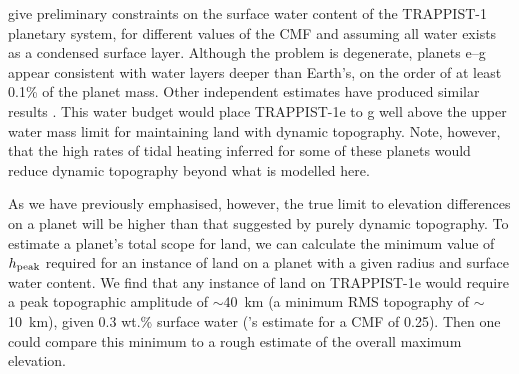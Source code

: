 \documentclass[trackchanges]{aastex63}
\newcommand{\todo}[1]{\textit{\textcolor{violet}{{#1}}}}
\begin{document}



\citet{agol_refining_2021} give preliminary constraints on the surface water content of the TRAPPIST-1 planetary system, for different values of the CMF and assuming all water exists as a condensed surface layer. Although the problem is degenerate, planets e--g appear consistent with water layers deeper than Earth's, on the order of at least 0.1\% of the planet mass. Other independent estimates have produced similar results \citep{acuna_characterisation_2021}.  %
This water budget would place TRAPPIST-1e to g well above the upper water mass limit for maintaining land with dynamic topography. Note, however, that the high rates of tidal heating inferred for some of these planets \citep{barr_interior_2018} would reduce dynamic topography beyond what is modelled here.

As we have previously emphasised, however, the true limit to elevation differences on a planet will be higher than that suggested by purely dynamic topography. To estimate a planet's total scope for land, we can calculate the minimum value of $h_{\rm peak}$ required for an instance of land on a planet with a given radius and surface water content. We find that any instance of land on TRAPPIST-1e would require a peak topographic amplitude of $\sim$40~km (a minimum RMS topography of $\sim$10~km), given 0.3 wt.\% surface water (\citeauthor{agol_refining_2021}'s estimate for a CMF of 0.25). Then one could compare this minimum to a rough estimate of the overall maximum elevation. %
\end{document}
